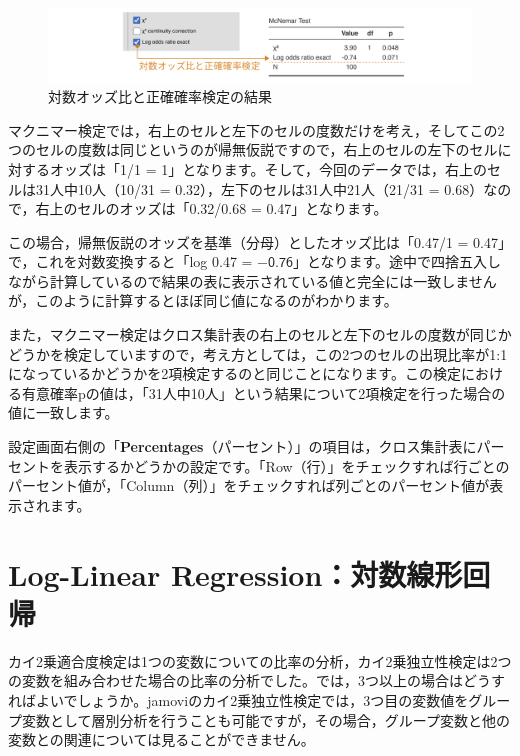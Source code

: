 \documentclass[
  12pt,
  a5jpaper,
  lualatex, ja=standard]{bxjsbook}
\begin{document}
\begin{figure}[!ht]

{\centering \includegraphics[width=1\linewidth]{images/frequencies/mcnemar-logodds} 

}

\caption{対数オッズ比と正確確率検定の結果}\label{fig:frequencies-mcnemar-logodds}
\end{figure}

マクニマー検定では，右上のセルと左下のセルの度数だけを考え，そしてこの2つのセルの度数は同じというのが帰無仮説ですので，右上のセルの左下のセルに対するオッズは「1/1 = 1」となります。そして，今回のデータでは，右上のセルは31人中10人（10/31 = 0.32），左下のセルは31人中21人（21/31 = 0.68）なので，右上のセルのオッズは「0.32/0.68 = 0.47」となります。

この場合，帰無仮説のオッズを基準（分母）としたオッズ比は「0.47/1 = 0.47」で，これを対数変換すると「log 0.47 = \(-\textsf{0.76}\)」となります。途中で四捨五入しながら計算しているので結果の表に表示されている値と完全には一致しませんが，このように計算するとほぼ同じ値になるのがわかります。

また，マクニマー検定はクロス集計表の右上のセルと左下のセルの度数が同じかどうかを検定していますので，考え方としては，この2つのセルの出現比率が1:1になっているかどうかを2項検定するのと同じことになります。この検定における有意確率pの値は，「31人中10人」という結果について2項検定を行った場合の値に一致します。

設定画面右側の「\textbf{Percentages}（パーセント）」の項目は，クロス集計表にパーセントを表示するかどうかの設定です。「Row（行）」をチェックすれば行ごとのパーセント値が，「Column（列）」をチェックすれば列ごとのパーセント値が表示されます。

\hypertarget{sec:frequencies-loglin}{%
\section{Log-Linear Regression：対数線形回帰}\label{sec:frequencies-loglin}}

カイ2乗適合度検定は1つの変数についての比率の分析，カイ2乗独立性検定は2つの変数を組み合わせた場合の比率の分析でした。では，3つ以上の場合はどうすればよいでしょうか。jamoviのカイ2乗独立性検定では，3つ目の変数値をグループ変数として層別分析を行うことも可能ですが，その場合，グループ変数と他の変数との関連については見ることができません。
\end{document}
